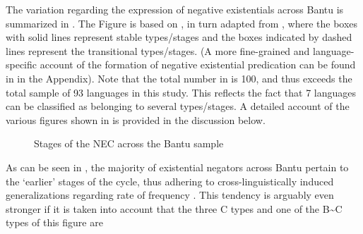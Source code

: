 \documentclass[output=paper]{langsci/langscibook}
\begin{document}
The variation regarding the expression of negative existentials across
Bantu is summarized in . The Figure is based on
\citet[146]{Veselinova2016}, in turn adapted from \citet[6]{Croft1991},
where the boxes with solid lines represent stable types\slash stages and the
boxes indicated by dashed lines represent the transitional types\slash stages. (A
more fine-grained and language-specific account of the formation of
negative existential predication can be found in  in the
Appendix). Note that the total number in  is 100,
and thus exceeds the total sample of 93 languages in this study. This
reflects the fact that 7 languages can be classified as belonging to
several types\slash stages. A detailed account of the various figures shown in
 is provided in the discussion below.
\begin{center}\begin{figure}[h]%
\caption{Stages of the NEC across the Bantu
sample}\label{fig:01-bantu-nec}\end{figure}\end{center} 
As can be seen in
, the majority
of existential negators across Bantu pertain to the `earlier' stages of the
cycle, thus adhering to cross-linguistically induced generalizations
regarding rate of frequency \parencites{Croft1991}{Veselinova2016}. This
tendency is arguably even stronger if it is taken into account that the
three C types and one of the B{\textasciitilde}C types of this figure are
\end{document}
